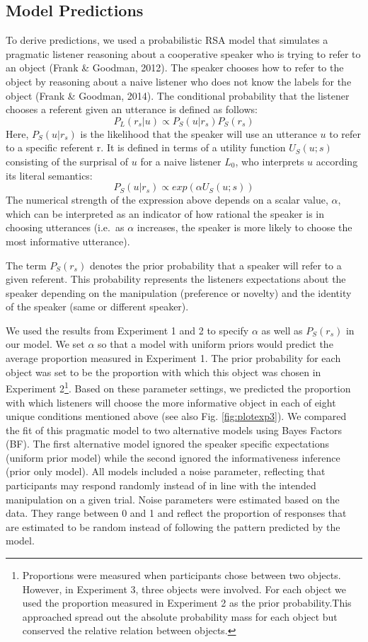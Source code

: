 \documentclass[10pt, letterpaper]{article}
\begin{document}
\subsection{Model Predictions}\label{model-predictions}

To derive predictions, we used a probabilistic RSA model that simulates
a pragmatic listener reasoning about a cooperative speaker who is trying
to refer to an object (Frank \& Goodman, 2012). The speaker chooses how
to refer to the object by reasoning about a naive listener who does not
know the labels for the object (Frank \& Goodman, 2014). The conditional
probability that the listener chooses a referent given an utterance is
defined as follows: \[P_L(r_s|u)\propto P_S(u|r_s)P_S(r_s)\] Here,
\(P_S(u|r_s)\) is the likelihood that the speaker will use an utterance
\(u\) to refer to a specific referent r. It is defined in terms of a
utility function \(U_S(u;s)\) consisting of the surprisal of \(u\) for a
naive listener \(L_0\), who interprets \(u\) according its literal
semantics: \[P_S(u|r_s)\propto exp(\alpha U_S(u;s))\] The numerical
strength of the expression above depends on a scalar value, \(\alpha\),
which can be interpreted as an indicator of how rational the speaker is
in choosing utterances (i.e.~as \(\alpha\) increases, the speaker is
more likely to choose the most informative utterance).

The term \(P_S(r_s)\) denotes the prior probability that a speaker will
refer to a given referent. This probability represents the listeners
expectations about the speaker depending on the manipulation (preference
or novelty) and the identity of the speaker (same or different speaker).

We used the results from Experiment 1 and 2 to specify \(\alpha\) as
well as \(P_S(r_s)\) in our model. We set \(\alpha\) so that a model
with uniform priors would predict the average proportion measured in
Experiment 1. The prior probability for each object was set to be the
proportion with which this object was chosen in Experiment
2\footnote{Proportions were measured when participants chose between two objects. However, in Experiment 3, three objects were involved. For each object we used the proportion measured in Experiment 2 as the prior probability.This approached spread out the absolute probability mass for each object but conserved the relative relation between objects.}.
Based on these parameter settings, we predicted the proportion with
which listeners will choose the more informative object in each of eight
unique conditions mentioned above (see also Fig. \ref{fig:plotexp3}). We
compared the fit of this pragmatic model to two alternative models using
Bayes Factors (BF). The first alternative model ignored the speaker
specific expectations (uniform prior model) while the second ignored the
informativeness inference (prior only model). All models included a
noise parameter, reflecting that participants may respond randomly
instead of in line with the intended manipulation on a given trial.
Noise parameters were estimated based on the data. They range between 0
and 1 and reflect the proportion of responses that are estimated to be
random instead of following the pattern predicted by the model.
\end{document}
